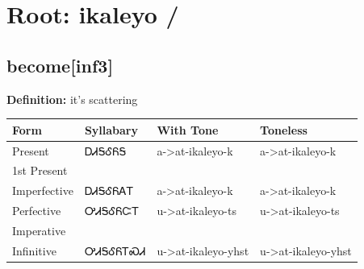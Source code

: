 \documentclass{article}%
\begin{document}
%
\normalsize%
\section*{Root: ikaleyo / }%
\subsection*{become[inf3]}%
\textbf{Definition: }%
it’s scattering%
\\[0.5em]%
\begin{tabular}{|l|l|l|l|}%
\hline%
\textbf{Form}&\textbf{Syllabary}&\textbf{With Tone}&\textbf{Toneless}\\%
\hline%
Present&ᎠᏗᎦᎴᏲᎦ&a{-}>at{-}ikaleyo{-}k&a{-}>at{-}ikaleyo{-}k\\%
1st Present&&&\\%
Imperfective&ᎠᏗᎦᎴᏲᎪᎢ&a{-}>at{-}ikaleyo{-}k&a{-}>at{-}ikaleyo{-}k\\%
Perfective&ᎤᏗᎦᎴᏲᏨᎢ&u{-}>at{-}ikaleyo{-}ts&u{-}>at{-}ikaleyo{-}ts\\%
Imperative&&&\\%
Infinitive&ᎤᏗᎦᎴᏲᎢᏍᏗ&u{-}>at{-}ikaleyo{-}yhst&u{-}>at{-}ikaleyo{-}yhst\\%
\hline%
\end{tabular}%
\\[1em]%
\end{document}
